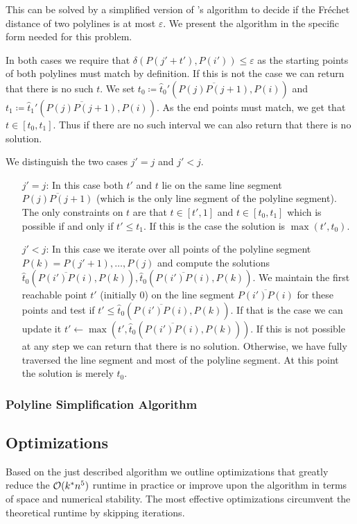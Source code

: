 This can be solved by a simplified version of \citeauthor{computing_the_frechet_distance_between_two_polygonal_curves}'s algorithm to decide if the Fréchet distance of two polylines is at most \(\varepsilon\). We present the algorithm in the specific form needed for this problem. 

In both cases we require that \(\delta(P(j' + t'), P(i')) \leq \varepsilon\) as the starting points of both polylines must match by definition. If this is not the case we can return that there is no such \(t\). We set \(t_0 \coloneq \hat t_0'(\overline{P(j)P(j+1)}, P(i))\) and \(t_1 \coloneq \hat t_1'(\overline{P(j)P(j+1)}, P(i))\). As the end points must match, we get that \(t \in [t_0, t_1]\). Thus if there are no such interval we can also return that there is no solution.

We distinguish the two cases \(j' = j\) and \(j' < j\). 
\begin{enumerate}
  \item[\(j' = j\): ] In this case both \(t'\) and \(t\) lie on the same line segment \(\overline{P(j)P(j+1)}\) (which is the only line segment of the polyline segment). The only constraints on \(t\) are that \(t \in [t', 1]\) and \(t \in [ t_0, t_1]\) which is possible if and only if \(t' \leq t_1\). If this is the case the solution is \(\max(t', t_0)\).

  \item[\(j' < j\): ] In this case we iterate over all points of the polyline segment \(P(k) = P(j'+1), \dots, P(j)\) and compute the solutions \(\hat t_0(\overline{P(i')P(i)}, P(k)), \hat t_0(\overline{P(i')P(i)}, P(k))\). We maintain the first reachable point \(t'\) (initially \(0\)) on the line segment \(\overline{P(i')P(i)}\) for these points and test if \(t' \leq \hat t_0(\overline{P(i')P(i)}, P(k))\). If that is the case we can update it \(t' \gets \max(t', \hat t_0(\overline{P(i')P(i)}, P(k)))\). If this is not possible at any step we can return that there is no solution. Otherwise, we have fully traversed the line segment and most of the polyline segment. At this point the solution is merely \(t_0\).
\end{enumerate}

\subsubsection{Polyline Simplification Algorithm}
\label{ssec:simple_algo_main}



\subsection{Optimizations}
\label{ssec:optimizations}
Based on the just described algorithm we outline optimizations that greatly reduce the \(\mathcal{O}(k^*n^5)\) runtime in practice or improve upon the algorithm in terms of space and numerical stability. The most effective optimizations circumvent the theoretical runtime by skipping iterations. 

